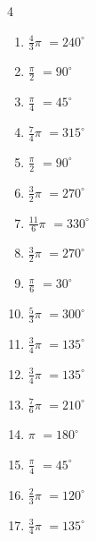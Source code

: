 \begin{multicols}{4}
\begin{enumerate}
  \item $\displaystyle \frac{4}{3}\pi$
        $\displaystyle =240^{\circ}$

  \item $\displaystyle \frac{\pi}{2}$
        $\displaystyle =90^{\circ}$

  \item $\displaystyle \frac{\pi}{4}$
        $\displaystyle =45^{\circ}$

  \item $\displaystyle \frac{7}{4}\pi$
        $\displaystyle =315^{\circ}$

  \item $\displaystyle \frac{\pi}{2}$
        $\displaystyle =90^{\circ}$

  \item $\displaystyle \frac{3}{2}\pi$
        $\displaystyle =270^{\circ}$

  \item $\displaystyle \frac{11}{6}\pi$
        $\displaystyle =330^{\circ}$

  \item $\displaystyle \frac{3}{2}\pi$
        $\displaystyle =270^{\circ}$

  \item $\displaystyle \frac{\pi}{6}$
        $\displaystyle =30^{\circ}$

  \item $\displaystyle \frac{5}{3}\pi$
        $\displaystyle =300^{\circ}$

  \item $\displaystyle \frac{3}{4}\pi$
        $\displaystyle =135^{\circ}$

  \item $\displaystyle \frac{3}{4}\pi$
        $\displaystyle =135^{\circ}$

  \item $\displaystyle \frac{7}{6}\pi$
        $\displaystyle =210^{\circ}$

  \item $\displaystyle \pi$
        $\displaystyle =180^{\circ}$

\columnbreak %

  \item $\displaystyle \frac{\pi}{4}$
        $\displaystyle =45^{\circ}$

  \item $\displaystyle \frac{2}{3}\pi$
        $\displaystyle =120^{\circ}$

  \item $\displaystyle \frac{3}{4}\pi$
        $\displaystyle =135^{\circ}$


\end{enumerate}
\end{multicols}
